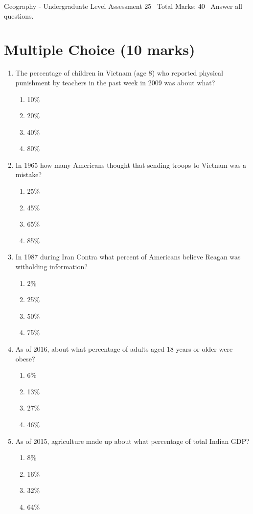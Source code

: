 \documentclass[12pt]{article}
\begin{document}
\begin{center}
Geography - Undergraduate Level Assessment 25 \
Total Marks: 40 \
Answer all questions.
\end{center}

\section*{Multiple Choice (10 marks)}
\begin{enumerate}[label=\arabic*.]
\item The percentage of children in Vietnam (age 8) who reported physical punishment by teachers in the past week in 2009 was about what?
\begin{enumerate}[label=(\alph*)]
    \item 10\%
    \item 20\%
    \item 40\%
    \item 80\%
\end{enumerate}
\item In 1965 how many Americans thought that sending troops to Vietnam was a mistake?
\begin{enumerate}[label=(\alph*)]
    \item 25\%
    \item 45\%
    \item 65\%
    \item 85\%
\end{enumerate}
\item In 1987 during Iran Contra what percent of Americans believe Reagan was witholding information?
\begin{enumerate}[label=(\alph*)]
    \item 2\%
    \item 25\%
    \item 50\%
    \item 75\%
\end{enumerate}
\item As of 2016, about what percentage of adults aged 18 years or older were obese?
\begin{enumerate}[label=(\alph*)]
    \item 6\%
    \item 13\%
    \item 27\%
    \item 46\%
\end{enumerate}
\item As of 2015, agriculture made up about what percentage of total Indian GDP?
\begin{enumerate}[label=(\alph*)]
    \item 8\%
    \item 16\%
    \item 32\%
    \item 64\%
\end{enumerate}
\end{enumerate}
\end{document}
